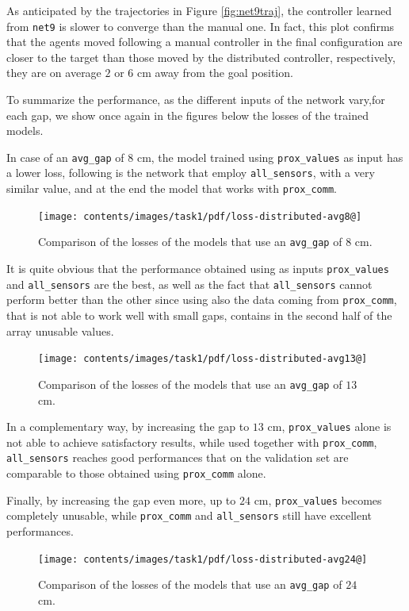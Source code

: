 As anticipated by the trajectories in Figure \ref{fig:net9traj}, the controller 
learned from \texttt{net9} is slower to converge than the manual one. In fact, 
this plot confirms that the agents moved following a manual controller in the final 
configuration are closer to the target than those moved by the distributed 
controller, respectively, they are on average $2$ or $6$ \gls{cm} away from the 
goal position.

To summarize the performance, as the different inputs of the network vary,for 
each gap, we show once again in the figures below the losses of the trained 
models.

In case of an \texttt{avg\_gap} of $8$ \gls{cm}, the model trained using 
\texttt{prox\_values} as input has a lower loss, following is the network that 
employ \texttt{all\_sensors}, with a very similar value, and at the end the model 
that works with \texttt{prox\_comm}.
\begin{figure}[!htb]
	\centering
	\texttt{[image: contents/images/task1/pdf/loss-distributed-avg8@]}%
	\caption{Comparison of the losses of the models that use an \texttt{avg\_gap} 
		of $8$ \gls{cm}.}
	\label{fig:distloss8}
\end{figure}
It is quite obvious that the performance obtained using as inputs 
\texttt{prox\_values} and \texttt{all\_sensors} are the best, as well as the fact that 
\texttt{all\_sensors} cannot perform better than the other since using also the 
data coming from \texttt{prox\_comm}, that is not able to work well with small 
gaps, contains in the second half of the array unusable values.

\begin{figure}[!htb]
	\centering
	\texttt{[image: contents/images/task1/pdf/loss-distributed-avg13@]}%
	\caption{Comparison of the losses of the models that use an \texttt{avg\_gap} 
		of $13$ \gls{cm}.}
	\label{fig:distloss13}
\end{figure}
In a complementary way, by increasing the gap to $13$ \gls{cm},  
\texttt{prox\_values} alone is not able to achieve satisfactory results, while used 
together with \texttt{prox\_comm}, \texttt{all\_sensors} reaches good 
performances that on the validation set are comparable to those obtained using 
\texttt{prox\_comm} alone.

Finally, by increasing the gap even more, up to $24$ \gls{cm}, 
\texttt{prox\_values} becomes completely unusable, while \texttt{prox\_comm} 
and \texttt{all\_sensors} still have excellent performances.
\begin{figure}[!htb]
	\centering
	\texttt{[image: contents/images/task1/pdf/loss-distributed-avg24@]}%
	\caption{Comparison of the losses of the models that use an \texttt{avg\_gap} 
	of $24$ \gls{cm}.}
	\label{fig:distloss24}
\end{figure}

